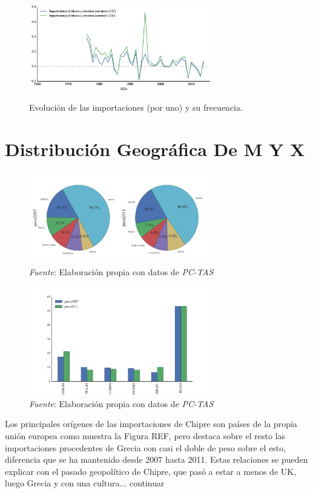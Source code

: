 \documentclass[a4paper,openright,12pt]{book}
\begin{document}
\begin{figure}[htb]
    \caption{Evolución de las importaciones (por uno) y su frecuencia.}
    \centering
    \includegraphics[width=300px]{ev_m.eps}
    \label{ev_m}
\end{figure}


\chapter{Distribución Geográfica De M Y X}
\label{cap3}

\begin{figure}[!ht]
    \centering
    \caption{}
    \includegraphics[width=300px]{pie_mgeo.pdf}
    \caption*{\textit{Fuente}: Elaboración propia con datos de \textit{PC-TAS}}
    \label{}
\end{figure}

\begin{figure}[!ht]
    \centering
    \caption{}
    \includegraphics[width=300px]{bar_mgeo.pdf}
    \caption*{\textit{Fuente}: Elaboración propia con datos de \textit{PC-TAS}}
    \label{}
\end{figure}

Los principales orígenes de las importaciones de Chipre son países de la propia unión europea como muestra la Figura REF, pero destaca sobre el resto las importaciones procedentes de Grecia con casi el doble de peso sobre el esto, diferencia que se ha mantenido desde 2007 hasta 2011.
Estas relaciones se pueden explicar con el pasado geopolítico de Chipre, que pasó a estar a menos de UK, luego Grecia y con una cultura... continuar
\end{document}
